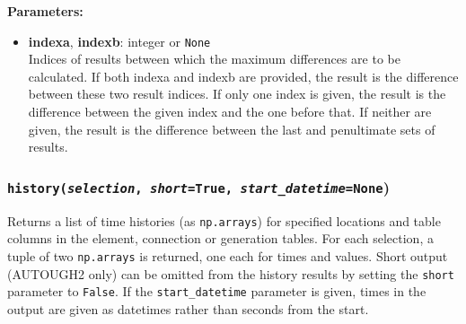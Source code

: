 \textbf{Parameters:}
\begin{itemize}
\item \textbf{indexa}, \textbf{indexb}: integer or \texttt{None}\\
  Indices of results between which the maximum differences are to be calculated.  If both indexa and indexb are provided, the result is the difference between these two result indices.  If only one index is given, the result is the difference between the given index and the one before that.  If neither are given, the result is the difference between the last and penultimate sets of results.
\end{itemize}

\begin{snugshade}
\subsubsection{\texttt{history(\emph{selection},  \emph{short}=True, \emph{start\_datetime}=None})}
\end{snugshade}
\label{sec:t2listing:history}

Returns a list of time histories (as \texttt{np.arrays}) for specified locations and table columns in the element, connection or generation tables.  For each selection, a tuple of two \texttt{np.arrays} is returned, one each for times and values.  Short output (AUTOUGH2 only) can be omitted from the history results by setting the \texttt{short} parameter to \texttt{False}. If the \texttt{start\_datetime} parameter is given, times in the output are given as datetimes rather than seconds from the start.

